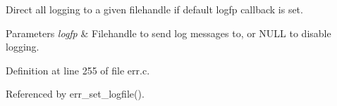 Direct all logging to a given filehandle if default logfp callback is set. 


\begin{DoxyParams}{Parameters}
{\em logfp} & Filehandle to send log messages to, or N\-U\-L\-L to disable logging. \\
\hline
\end{DoxyParams}


Definition at line 255 of file err.\-c.



Referenced by err\-\_\-set\-\_\-logfile().


